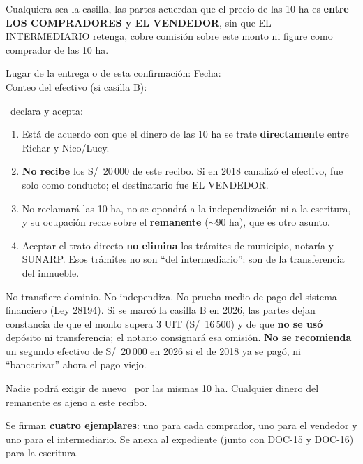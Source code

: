 \documentclass[12pt,a4paper]{article}
\begin{document}
Cualquiera sea la casilla, las partes acuerdan que el precio de las 10 ha es \textbf{entre LOS COMPRADORES y EL VENDEDOR}, sin que EL INTERMEDIARIO retenga, cobre comisión sobre este monto ni figure como comprador de las 10 ha.

\vspace{0.2em}
\noindent Lugar de la entrega o de esta confirmación: \linea[6.5cm]\quad Fecha: \linea[4.2cm]\\
Conteo del efectivo (si casilla B): \linea[11.8cm]

\IntermediarioNombre\ declara y acepta:

\begin{enumerate}[leftmargin=1.15cm]
\item Está de acuerdo con que el dinero de las 10 ha se trate \textbf{directamente} entre Richar y Nico/Lucy.
\item \textbf{No recibe} los S/\ 20\,000 de este recibo. Si en 2018 canalizó el efectivo, fue solo como conducto; el destinatario fue EL VENDEDOR.
\item No reclamará las 10 ha, no se opondrá a la independización ni a la escritura, y su ocupación recae sobre el \textbf{remanente} ($\sim$90 ha), que es otro asunto.
\item Aceptar el trato directo \textbf{no elimina} los trámites de municipio, notaría y SUNARP. Esos trámites no son ``del intermediario'': son de la transferencia del inmueble.
\end{enumerate}

No transfiere dominio. No independiza. No prueba medio de pago del sistema financiero (Ley 28194). Si se marcó la casilla B en 2026, las partes dejan constancia de que el monto supera 3 UIT (S/\ 16\,500) y de que \textbf{no se usó} depósito ni transferencia; el notario consignará esa omisión. \textbf{No se recomienda} un segundo efectivo de S/\ 20\,000 en 2026 si el de 2018 ya se pagó, ni ``bancarizar'' ahora el pago viejo.

Nadie podrá exigir de nuevo \MontoPago\ por las mismas 10 ha. Cualquier dinero del remanente es ajeno a este recibo.

Se firman \textbf{cuatro ejemplares}: uno para cada comprador, uno para el vendedor y uno para el intermediario. Se anexa al expediente (junto con DOC-15 y DOC-16) para la escritura.
\end{document}

